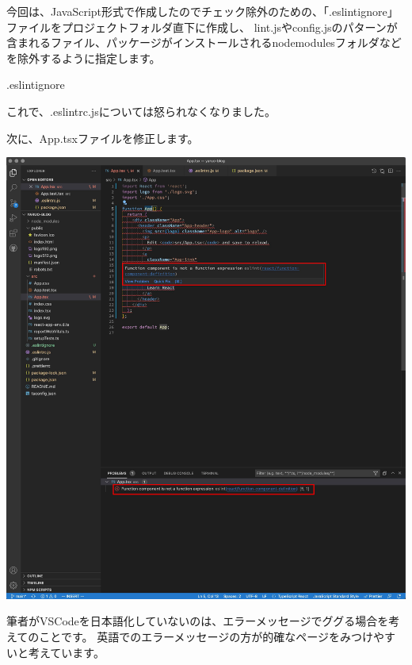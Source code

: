 今回は、JavaScript形式で作成したのでチェック除外のための、「.eslintignore」ファイルをプロジェクトフォルダ直下に作成し、
lint.jsやconfig.jsのパターンが含まれるファイル、パッケージがインストールされるnode\textunderscore{}modulesフォルダなどを除外するように指定します。

\def\startercodeblockfontsize{}
\begin{starterprogram}[]{.eslintignore}\end{starterprogram}

これで、.eslintrc.jsについては怒られなくなりました。

次に、App.tsxファイルを修正します。

\begin{reviewimage}[H]%
\includegraphics[width=1.0\maxwidth]{./images/02-create-react-app/032_app_tsx_error.png}%
\label{image:02-create-react-app:032_app_tsx_error}
\end{reviewimage}
\begin{starternote}[]{}

筆者がVSCodeを日本語化していないのは、エラーメッセージでググる場合を考えてのことです。
英語でのエラーメッセージの方が的確なページをみつけやすいと考えています。

\end{starternote}

